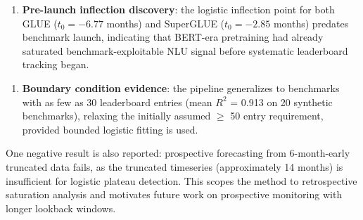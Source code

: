 \begin{enumerate}
\item \textbf{Pre-launch inflection discovery}: the logistic inflection point for both GLUE ($t_0 = -6.77$ months) and SuperGLUE ($t_0 = -2.85$ months) predates benchmark launch, indicating that BERT-era pretraining \citep{devlin2019bert} had already saturated benchmark-exploitable NLU signal before systematic leaderboard tracking began.
\end{enumerate}

\begin{enumerate}
\item \textbf{Boundary condition evidence}: the pipeline generalizes to benchmarks with as few as 30 leaderboard entries (mean $R^2$ = 0.913 on 20 synthetic benchmarks), relaxing the initially assumed $\geq$ 50 entry requirement, provided bounded logistic fitting is used.
\end{enumerate}

One negative result is also reported: prospective forecasting from 6-month-early truncated data fails, as the truncated timeseries (approximately 14 months) is insufficient for logistic plateau detection. This scopes the method to retrospective saturation analysis and motivates future work on prospective monitoring with longer lookback windows.

